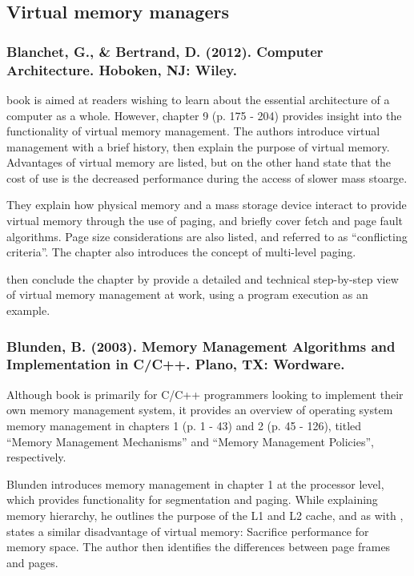 \subsection{Virtual memory managers}

\subsubsection*{Blanchet, G., \& Bertrand, D. (2012). Computer Architecture. Hoboken, NJ: Wiley.}

 book is aimed at readers wishing to learn about the essential architecture of a computer as a whole. However, chapter 9 (p. 175 - 204) provides insight into the functionality of virtual memory management. The authors introduce virtual management with a brief history, then explain the purpose of virtual memory. Advantages of virtual memory are listed, but on the other hand state that the cost of use is the decreased performance during the access of slower mass stoarge.%

They explain how physical memory and a mass storage device interact to provide virtual memory through the use of paging, and briefly cover fetch and page fault algorithms. Page size considerations are also listed, and referred to as ``conflicting criteria''. The chapter also introduces the concept of multi-level paging.

\citet{Blanchet2012} then conclude the chapter by provide a detailed and technical step-by-step view of virtual memory management at work, using a program execution as an example.

\subsubsection*{Blunden, B. (2003). Memory Management Algorithms and Implementation in C/C++. Plano, TX: Wordware.}

Although  book is primarily for C/C++ programmers looking to implement their own memory management system, it provides an overview of operating system memory management in chapters 1 (p. 1 - 43) and 2 (p. 45 - 126), titled ``Memory Management Mechanisms'' and ``Memory Management Policies'', respectively.

Blunden introduces memory management in chapter 1 at the processor level, which provides functionality for segmentation and paging. While explaining memory hierarchy, he outlines the purpose of the L1 and L2 cache, and as with \citet{Blanchet2012}, states a similar disadvantage of virtual memory: Sacrifice performance for memory space. The author then identifies the differences between page frames and pages.

